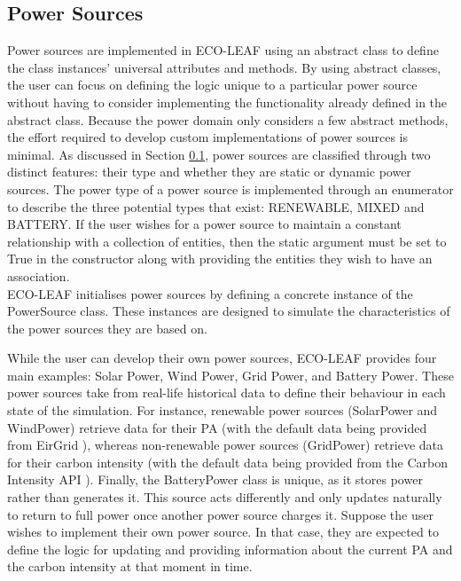 \documentclass{l4proj}
\begin{document}
\subsection{Power Sources}\label{sec:power-sources}
Power sources are implemented in ECO-LEAF using an abstract class to define the class instances' universal attributes and methods.
By using abstract classes, the user can focus on defining the logic unique to a particular power source without having to consider implementing the functionality already defined in the abstract class.
Because the power domain only considers a few abstract methods, the effort required to develop custom implementations of power sources is minimal.
As discussed in Section \ref{sec:power-sources}, power sources are classified through two distinct features: their type and whether they are static or dynamic power sources.
The power type of a power source is implemented through an enumerator to describe the three potential types that exist: RENEWABLE, MIXED and BATTERY.
If the user wishes for a power source to maintain a constant relationship with a collection of entities, then the static argument must be set to True in the constructor along with providing the entities they wish to have an association.\\
ECO-LEAF initialises power sources by defining a concrete instance of the PowerSource class.
These instances are designed to simulate the characteristics of the power sources they are based on.

While the user can develop their own power sources, ECO-LEAF provides four main examples: Solar Power, Wind Power, Grid Power, and Battery Power.
These power sources take from real-life historical data to define their behaviour in each state of the simulation.
For instance, renewable power sources (SolarPower and WindPower) retrieve data for their PA (with the default data being provided from EirGrid \citep{eirgrid}), whereas non-renewable power sources (GridPower) retrieve data for their carbon intensity (with the default data being provided from the Carbon Intensity API \citep{carbon_intensity_api}).
Finally, the BatteryPower class is unique, as it stores power rather than generates it.
This source acts differently and only updates naturally to return to full power once another power source charges it.
Suppose the user wishes to implement their own power source.
In that case, they are expected to define the logic for updating and providing information about the current PA and the carbon intensity at that moment in time.
\end{document}
